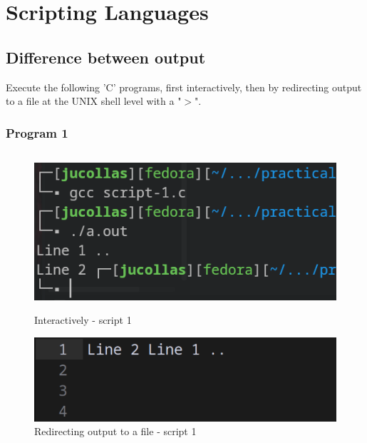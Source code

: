 \documentclass[12pt]{article}
\begin{document}
\newpage

\section{Scripting Languages}

\subsection{Difference between output}

Execute the following 'C' programs, first interactively, then by
redirecting output to a file at the UNIX shell level with a "$>$".

\subsubsection*{Program 1}
\inputminted{cpp}{scripts/script-1.c}

\begin{figure}[h]
    \centering
    \begin{minipage}{0.45\textwidth}
        \centering
        \includegraphics[width=\linewidth]{images/interactive-script1.png}
        \caption{Interactively - script 1}
    \end{minipage}
    \hfill %
    \begin{minipage}{0.45\textwidth}
        \centering
        \includegraphics[width=\linewidth]{images/outfile-script1.png}
        \caption{Redirecting output to a file - script 1}
    \end{minipage}
\end{figure}
\end{document}
